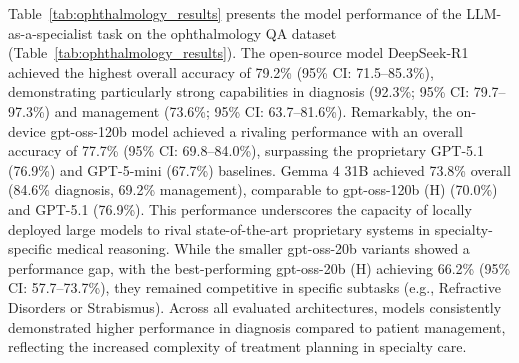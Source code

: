 \documentclass[10pt,journal,compsoc, onecolumn]{IEEEtran}
\begin{document}
Table~\ref{tab:ophthalmology_results} presents the model performance of the LLM-as-a-specialist task on the ophthalmology QA dataset (Table~\ref{tab:ophthalmology_results}). The open-source model DeepSeek-R1 achieved the highest overall accuracy of 79.2\% (95\% CI: 71.5--85.3\%), demonstrating particularly strong capabilities in diagnosis (92.3\%; 95\% CI: 79.7--97.3\%) and management (73.6\%; 95\% CI: 63.7--81.6\%). Remarkably, the on-device gpt-oss-120b model achieved a rivaling performance with an overall accuracy of 77.7\% (95\% CI: 69.8--84.0\%), surpassing the proprietary GPT-5.1 (76.9\%) and GPT-5-mini (67.7\%) baselines. Gemma 4 31B achieved 73.8\% overall (84.6\% diagnosis, 69.2\% management), comparable to gpt-oss-120b (H) (70.0\%) and GPT-5.1 (76.9\%). This performance underscores the capacity of locally deployed large models to rival state-of-the-art proprietary systems in specialty-specific medical reasoning. While the smaller gpt-oss-20b variants showed a performance gap, with the best-performing gpt-oss-20b (H) achieving 66.2\% (95\% CI: 57.7--73.7\%), they remained competitive in specific subtasks (e.g., Refractive Disorders or Strabismus). Across all evaluated architectures, models consistently demonstrated higher performance in diagnosis compared to patient management, reflecting the increased complexity of treatment planning in specialty care.
\end{document}
